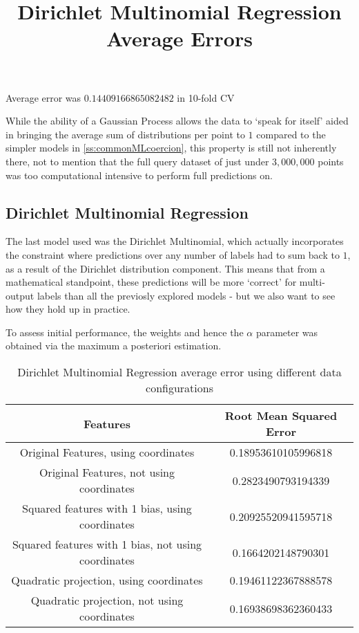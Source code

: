 Average error was $0.14409166865082482$ in 10-fold CV 

While the ability of a Gaussian Process allows the data to `speak for itself' aided in bringing the average sum of distributions per point to $1$ compared to the simpler models in \ref{ss:commonMLcoercion}, this property is still not inherently there, not to mention that the full query dataset of just under $3,000,000$ points was too computational intensive to perform full predictions on.

\subsection{Dirichlet Multinomial Regression}

The last model used was the Dirichlet Multinomial, which actually incorporates the constraint where predictions over any number of labels had to sum back to $1$, as a result of the Dirichlet distribution component. This means that from a mathematical standpoint, these predictions will be more `correct' for multi-output labels than all the previosly explored models - but we also want to see how they hold up in practice.

To assess initial performance, the weights and hence the $\alpha$ parameter was obtained via the maximum a posteriori estimation.



\begin{table}[H]
    \centering
    \title{Dirichlet Multinomial Regression Average Errors}
    \begin{tabular}{|c|c|}
        \hline
        Features & Root Mean Squared Error \\\hline
        Original Features, using coordinates & 0.18953610105996818 \\
        Original Features, not using coordinates & 0.2823490793194339 \\
        Squared features with 1 bias, using coordinates & 0.20925520941595718 \\
        Squared features with 1 bias, not using coordinates & 0.1664202148790301 \\
        Quadratic projection, using coordinates & 0.19461122367888578 \\
        Quadratic projection, not using coordinates & 0.16938698362360433 \\
        \hline
    \end{tabular}
    \label{table:dmbasicresults}
    \caption{Dirichlet Multinomial Regression average error using different data configurations}
\end{table}

